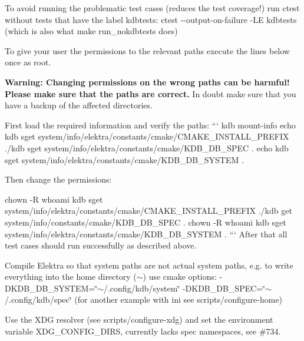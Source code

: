 \begin{DoxyEnumerate}
\item To avoid running the problematic test cases (reduces the test coverage!) run {\ttfamily ctest} without tests that have the label {\ttfamily kdbtests}\+: {\ttfamily ctest -\/-\/output-\/on-\/failure -\/\+LE kdbtests} (which is also what {\ttfamily make run\+\_\+nokdbtests} does)
\item To give your user the permissions to the relevant paths execute the lines below once as root.

{\bfseries Warning\+: Changing permissions on the wrong paths can be harmful! Please make sure that the paths are correct.} In doubt make sure that you have a backup of the affected directories.

First load the required information and verify the paths\+: ``` kdb mount-\/info echo {\ttfamily kdb sget system/info/elektra/constants/cmake/\+C\+M\+A\+K\+E\+\_\+\+I\+N\+S\+T\+A\+L\+L\+\_\+\+P\+R\+E\+F\+IX .}/{\ttfamily kdb sget system/info/elektra/constants/cmake/\+K\+D\+B\+\_\+\+D\+B\+\_\+\+S\+P\+EC .} echo {\ttfamily kdb sget system/info/elektra/constants/cmake/\+K\+D\+B\+\_\+\+D\+B\+\_\+\+S\+Y\+S\+T\+EM .} 
\begin{DoxyCode}
Then change the permissions:
\end{DoxyCode}
 chown -\/R {\ttfamily whoami} {\ttfamily kdb sget system/info/elektra/constants/cmake/\+C\+M\+A\+K\+E\+\_\+\+I\+N\+S\+T\+A\+L\+L\+\_\+\+P\+R\+E\+F\+IX .}/{\ttfamily kdb get system/info/constants/cmake/\+K\+D\+B\+\_\+\+D\+B\+\_\+\+S\+P\+EC .} chown -\/R {\ttfamily whoami} {\ttfamily kdb sget system/info/elektra/constants/cmake/\+K\+D\+B\+\_\+\+D\+B\+\_\+\+S\+Y\+S\+T\+EM .} ``` After that all test cases should run successfully as described above.
\item Compile Elektra so that system paths are not actual system paths, e.\+g. to write everything into the home directory ({\ttfamily $\sim$}) use cmake options\+: {\ttfamily -\/\+D\+K\+D\+B\+\_\+\+D\+B\+\_\+\+S\+Y\+S\+T\+EM=\char`\"{}$\sim$/.\+config/kdb/system\char`\"{} -\/\+D\+K\+D\+B\+\_\+\+D\+B\+\_\+\+S\+P\+EC=\char`\"{}$\sim$/.\+config/kdb/spec\char`\"{}} (for another example with ini see {\ttfamily scripts/configure-\/home})
\item Use the X\+DG resolver (see {\ttfamily scripts/configure-\/xdg}) and set the environment variable {\ttfamily X\+D\+G\+\_\+\+C\+O\+N\+F\+I\+G\+\_\+\+D\+I\+RS}, currently lacks {\ttfamily spec} namespaces, see \#734.
\end{DoxyEnumerate}

